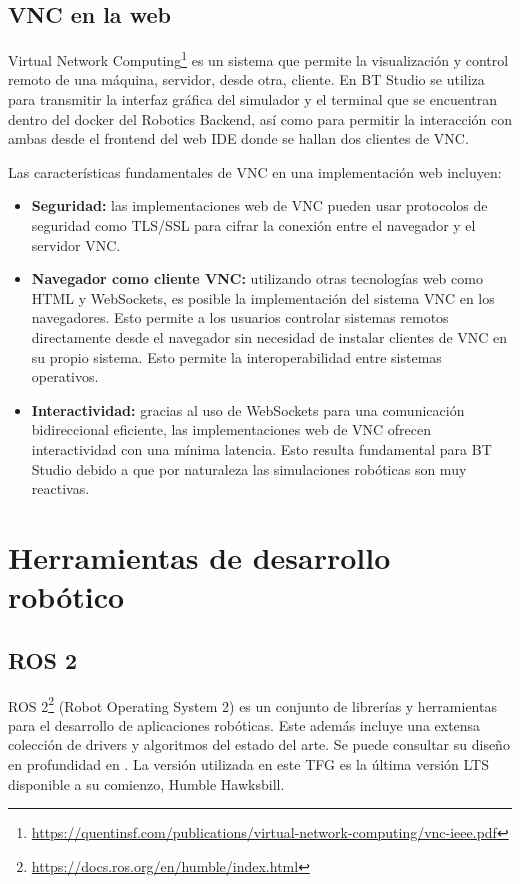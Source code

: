 \subsection{VNC en la web}

Virtual Network Computing\footnote{\url{https://quentinsf.com/publications/virtual-network-computing/vnc-ieee.pdf}} es un sistema que permite la visualización y control remoto de una máquina, servidor, desde otra, cliente. En BT Studio se utiliza para transmitir la interfaz gráfica del simulador y el terminal que se encuentran dentro del docker del Robotics Backend, así como para permitir la interacción con ambas desde el frontend del web IDE donde se hallan dos clientes de VNC.

Las características fundamentales de VNC en una implementación web incluyen:

\begin{itemize}
    \item \textbf{Seguridad:} las implementaciones web de VNC pueden usar protocolos de seguridad como TLS/SSL para cifrar la conexión entre el navegador y el servidor VNC. 
    
    \item \textbf{Navegador como cliente VNC:} utilizando otras tecnologías web como HTML y WebSockets, es posible la implementación del sistema VNC en los navegadores. Esto permite a los usuarios controlar sistemas remotos directamente desde el navegador sin necesidad de instalar clientes de VNC en su propio sistema. Esto permite la interoperabilidad entre sistemas operativos. 
    
    \item \textbf{Interactividad:} gracias al uso de WebSockets para una comunicación bidireccional eficiente, las implementaciones web de VNC ofrecen interactividad con una mínima latencia. Esto resulta fundamental para BT Studio debido a que por naturaleza las simulaciones robóticas son muy reactivas. 
\end{itemize}

\section{Herramientas de desarrollo robótico}

\subsection{ROS 2}
\label{ros_2}

ROS 2\footnote{\url{https://docs.ros.org/en/humble/index.html}} (Robot Operating System 2) es un conjunto de librerías y herramientas para el desarrollo de aplicaciones robóticas. Este además incluye una extensa colección de drivers y algoritmos del estado del arte. Se puede consultar su diseño en profundidad en \cite{Macenski_2022}. La versión utilizada en este TFG es la última versión LTS disponible a su comienzo, Humble Hawksbill. 

